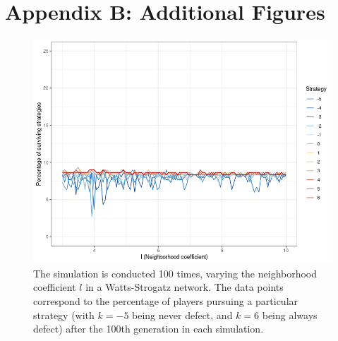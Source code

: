 \documentclass{JASSS}
\begin{document}
\section{Appendix B: Additional Figures}
\begin{figure}
	\centering
	\includegraphics[width=\linewidth]{./figures/results_WS_N300_truthful_new_vary_nei.png}
	\caption{The simulation is conducted 100 times, varying the neighborhood coefficient $l$ in a Watts-Strogatz network. The data points correspond to the percentage of players pursuing a particular strategy (with $k=-5$ being never defect, and $k=6$ being always defect) after the 100th generation in each simulation.}
	\label{WS_300_l_100sims}
\end{figure}
\end{document}
